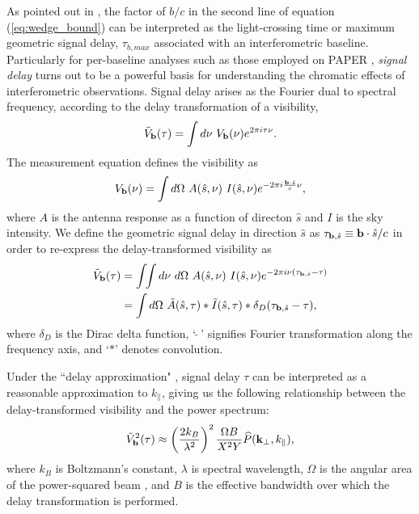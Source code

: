 \documentclass[11pt]{article}
\newcommand{\kvec}{{\bf k}}
\newcommand{\bvec}{{\bf b}}
\newcommand{\shat}{{\hat s}}
\newcommand{\kvpr}{{\kvec_\perp}}
\newcommand{\kpl}{{k_\parallel}}
\begin{document}
As pointed out in \citet{2012ApJ...756..165P}, the factor of $b/c$ in the
second line of equation (\ref{eq:wedge_bound}) can be interpreted as the light-crossing time
or maximum geometric signal delay, $\tau_{b,max}$ associated with an interferometric baseline.  
Particularly for per-baseline
analyses such as those
employed on PAPER \citep{2014ApJ...788..106P,2015ApJ...801...51J,2015arXiv150205072M,2015arXiv150206016A},
{\it signal delay} turns out to be a 
powerful basis for understanding the chromatic effects of interferometric observations.
Signal delay arises as the Fourier dual to spectral frequency, according to the delay
transformation of a visibility,
\begin{equation}
\tilde V_\bvec(\tau)=\int{d\nu~V_\bvec(\nu) e^{2\pi i\tau\nu}}.
\end{equation}
The measurement equation defines the visibility as
\begin{equation}
V_\bvec(\nu)=\int{d\Omega~A(\shat,\nu)~I(\shat,\nu) e^{-2\pi i\frac{\bvec\cdot\shat}{c}\nu}},
\label{eq:meas_eq}
\end{equation}
where $A$ is the antenna response as a function of directon $\shat$ and $I$ is the sky intensity.
We define the geometric signal delay in direction $\shat$ as $\tau_{\bvec,\shat}\equiv\bvec\cdot\shat/c$
in order to re-express the delay-transformed visibility as
\begin{align}
\tilde V_\bvec(\tau)&=\int\!\!\int{d\nu~d\Omega~A(\shat,\nu)~I(\shat,\nu) e^{-2\pi i\nu(\tau_{\bvec,\shat}-\tau)}}\nonumber\\
&=\int{d\Omega~\tilde A(\shat,\tau)*\tilde I(\shat,\tau)*\delta_D(\tau_{\bvec,\shat}-\tau)},
\end{align}
where $\delta_D$ is the Dirac delta function, `$~\tilde{}~$' signifies Fourier transformation along
the frequency axis, and `$*$' denotes convolution.

Under the ``delay approximation" \citep{2012ApJ...756..165P},
signal delay $\tau$ can be interpreted as a reasonable approximation to $\kpl$, giving us the following relationship
between the delay-transformed visibility and the power spectrum:
\begin{equation}
\tilde V_\bvec^2(\tau)\approx\left(\frac{2k_B}{\lambda^2}\right)^2\frac{\Omega B}{X^2Y}\widehat P(\kvpr,\kpl),
\label{eq:v2_to_pk}
\end{equation}
where $k_B$ is Boltzmann's constant, $\lambda$ is spectral wavelength, $\Omega$ is the angular area of the power-squared
beam \citep{2014ApJ...788..106P}, and $B$ is the effective bandwidth over which the delay transformation is performed.
\end{document}
